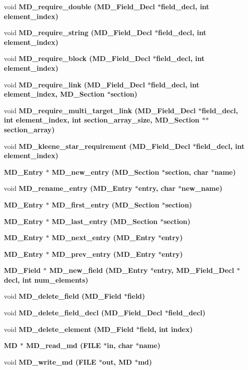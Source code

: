 \begin{CompactItemize}
\item 
void \bf{MD\_\-require\_\-double} (\bf{MD\_\-Field\_\-Decl} $\ast$field\_\-decl, int element\_\-index)
\item 
void \bf{MD\_\-require\_\-string} (\bf{MD\_\-Field\_\-Decl} $\ast$field\_\-decl, int element\_\-index)
\item 
void \bf{MD\_\-require\_\-block} (\bf{MD\_\-Field\_\-Decl} $\ast$field\_\-decl, int element\_\-index)
\item 
void \bf{MD\_\-require\_\-link} (\bf{MD\_\-Field\_\-Decl} $\ast$field\_\-decl, int element\_\-index, \bf{MD\_\-Section} $\ast$section)
\item 
void \bf{MD\_\-require\_\-multi\_\-target\_\-link} (\bf{MD\_\-Field\_\-Decl} $\ast$field\_\-decl, int element\_\-index, int section\_\-array\_\-size, \bf{MD\_\-Section} $\ast$$\ast$section\_\-array)
\item 
void \bf{MD\_\-kleene\_\-star\_\-requirement} (\bf{MD\_\-Field\_\-Decl} $\ast$field\_\-decl, int element\_\-index)
\item 
\bf{MD\_\-Entry} $\ast$ \bf{MD\_\-new\_\-entry} (\bf{MD\_\-Section} $\ast$section, char $\ast$\bf{name})
\item 
void \bf{MD\_\-rename\_\-entry} (\bf{MD\_\-Entry} $\ast$\bf{entry}, char $\ast$new\_\-name)
\item 
\bf{MD\_\-Entry} $\ast$ \bf{MD\_\-first\_\-entry} (\bf{MD\_\-Section} $\ast$section)
\item 
\bf{MD\_\-Entry} $\ast$ \bf{MD\_\-last\_\-entry} (\bf{MD\_\-Section} $\ast$section)
\item 
\bf{MD\_\-Entry} $\ast$ \bf{MD\_\-next\_\-entry} (\bf{MD\_\-Entry} $\ast$\bf{entry})
\item 
\bf{MD\_\-Entry} $\ast$ \bf{MD\_\-prev\_\-entry} (\bf{MD\_\-Entry} $\ast$\bf{entry})
\item 
\bf{MD\_\-Field} $\ast$ \bf{MD\_\-new\_\-field} (\bf{MD\_\-Entry} $\ast$\bf{entry}, \bf{MD\_\-Field\_\-Decl} $\ast$decl, int num\_\-elements)
\item 
void \bf{MD\_\-delete\_\-field} (\bf{MD\_\-Field} $\ast$field)
\item 
void \bf{MD\_\-delete\_\-field\_\-decl} (\bf{MD\_\-Field\_\-Decl} $\ast$field\_\-decl)
\item 
void \bf{MD\_\-delete\_\-element} (\bf{MD\_\-Field} $\ast$field, int index)
\item 
\bf{MD} $\ast$ \bf{MD\_\-read\_\-md} (FILE $\ast$in, char $\ast$\bf{name})
\item 
void \bf{MD\_\-write\_\-md} (FILE $\ast$out, \bf{MD} $\ast$md)
$$
\end{CompactItemize}
